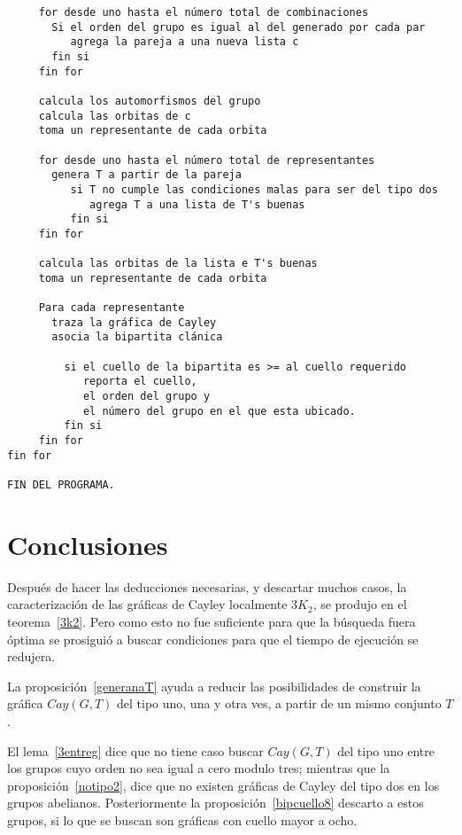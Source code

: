 \documentclass[11pt]{book}
\theoremstyle{definition}
\begin{document}
\begin{small}
\begin{verbatim}
     for desde uno hasta el número total de combinaciones
       Si el orden del grupo es igual al del generado por cada par     
          agrega la pareja a una nueva lista c
       fin si
     fin for    

     calcula los automorfismos del grupo
     calcula las orbitas de c 
     toma un representante de cada orbita

     for desde uno hasta el número total de representantes
       genera T a partir de la pareja
          si T no cumple las condiciones malas para ser del tipo dos
             agrega T a una lista de T's buenas
          fin si 
     fin for 

     calcula las orbitas de la lista e T's buenas
     toma un representante de cada orbita  
  
     Para cada representante 
       traza la gráfica de Cayley
       asocia la bipartita clánica
                      
         si el cuello de la bipartita es >= al cuello requerido
            reporta el cuello,
            el orden del grupo y 
            el número del grupo en el que esta ubicado.       
         fin si 
     fin for
fin for

FIN DEL PROGRAMA.

\end{verbatim}
\end{small}

\chapter{Conclusiones}


Después de hacer las deducciones necesarias, y descartar muchos casos,
la caracterización de las gráficas de Cayley localmente $3K_2$, se
produjo en el teorema~\ref{3k2}. Pero como esto no fue suficiente para
que la búsqueda fuera óptima se prosiguió a buscar condiciones para
que el tiempo de ejecución se redujera.


La proposición~\ref{generanaT} ayuda a reducir las posibilidades de
construir la gráfica $Cay(G,T)$ del tipo uno, una y otra ves, a partir
de un mismo conjunto $T$.


El lema~\ref{3entreg} dice que no tiene caso buscar $Cay(G,T)$ del
tipo uno entre los grupos cuyo orden no sea igual a cero modulo tres;
mientras que la proposición~\ref{notipo2}, dice que no existen
gráficas de Cayley del tipo dos en los grupos
abelianos. Posteriormente la proposición~\ref{bipcuello8} descarto a
estos grupos, si lo que se buscan son gráficas con cuello mayor a
ocho.
\end{document}
